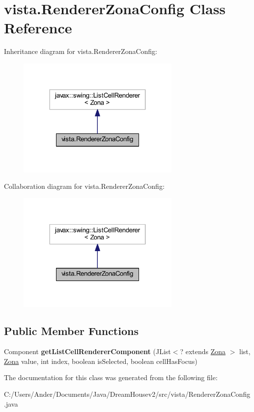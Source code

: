 \hypertarget{classvista_1_1_renderer_zona_config}{}\section{vista.\+Renderer\+Zona\+Config Class Reference}
\label{classvista_1_1_renderer_zona_config}


Inheritance diagram for vista.\+Renderer\+Zona\+Config\+:
\nopagebreak
\begin{figure}[H]
\begin{center}
\leavevmode
\includegraphics[width=226pt]{classvista_1_1_renderer_zona_config__inherit__graph}
\end{center}
\end{figure}


Collaboration diagram for vista.\+Renderer\+Zona\+Config\+:
\nopagebreak
\begin{figure}[H]
\begin{center}
\leavevmode
\includegraphics[width=226pt]{classvista_1_1_renderer_zona_config__coll__graph}
\end{center}
\end{figure}
\subsection*{Public Member Functions}
\begin{DoxyCompactItemize}
\item 
\mbox{\label{classvista_1_1_renderer_zona_config_a79630527664cb2745d0f55dcf719137a}} 
Component {\bfseries get\+List\+Cell\+Renderer\+Component} (J\+List$<$? extends \mbox{\hyperlink{classmodelo_1_1_zona}{Zona}} $>$ list, \mbox{\hyperlink{classmodelo_1_1_zona}{Zona}} value, int index, boolean is\+Selected, boolean cell\+Has\+Focus)
\end{DoxyCompactItemize}


The documentation for this class was generated from the following file\+:\begin{DoxyCompactItemize}
\item 
C\+:/\+Users/\+Ander/\+Documents/\+Java/\+Dream\+Housev2/src/vista/Renderer\+Zona\+Config.\+java\end{DoxyCompactItemize}

